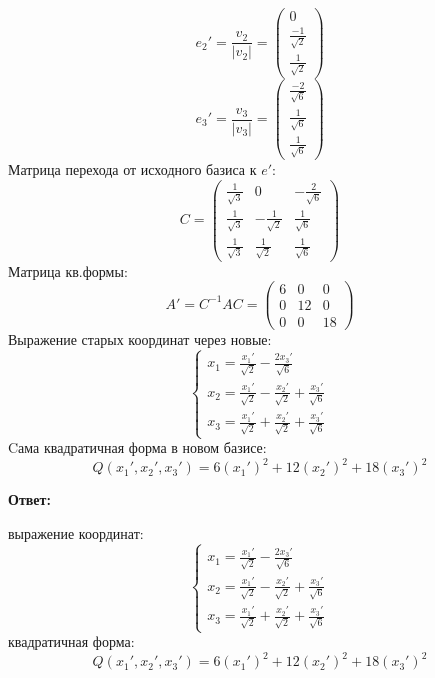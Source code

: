 \documentclass[a4paper,12pt]{article}
\begin{document}
\[
e_2' = \frac{v_2}{|v_2|} = \begin{pmatrix}
0 \\ \frac{-1}{\sqrt{2}} \\ \frac{1}{\sqrt{2}}
\end{pmatrix}
\]
\[
e_3' =  \frac{v_3}{|v_3|} = \begin{pmatrix}
\frac{-2}{\sqrt{6}} \\ \frac{1}{\sqrt{6}}  \\ \frac{1}{\sqrt{6}} 
\end{pmatrix}
\]
Матрица перехода от исходного базиса к $e'$:
\[
C = \begin{pmatrix}
\frac{1}{\sqrt{3}} & 0 & -\frac{2}{\sqrt{6}} \\
\frac{1}{\sqrt{3}}  & -\frac{1}{\sqrt{2}} & \frac{1}{\sqrt{6}}\\
\frac{1}{\sqrt{3}}  & \frac{1}{\sqrt{2}} & \frac{1}{\sqrt{6}}
\end{pmatrix}
\]
Матрица кв.формы:
\[
A' = C^{-1} A C = \begin{pmatrix}
6 & 0 & 0 \\
0 & 12 & 0 \\
0 & 0 & 18
\end{pmatrix}
\]
Выражение старых координат через новые:
\[
\begin{cases}
x_1 = \frac{x_1'}{\sqrt{2}}- \frac{2x_3'}{\sqrt{6}} \\
x_2 = \frac{x_1' }{\sqrt{2}}- \frac{x_2'}{\sqrt{2}}+\frac{ x_3'}{\sqrt{6}} \\
x_3 = \frac{x_1'}{\sqrt{2}} + \frac{x_2'}{\sqrt{2}}+ \frac{x_3'}{\sqrt{6}}
\end{cases}
\]
Cама квадратичная форма в новом базисе:
\[
Q(x_1', x_2', x_3') = 6(x_1')^2 + 12(x_2')^2 + 18(x_3')^2
\]

\begin{center}
\textbf{Ответ: } 

выражение координат:
\[
\begin{cases}
x_1 = \frac{x_1'}{\sqrt{2}}- \frac{2x_3'}{\sqrt{6}} \\
x_2 = \frac{x_1' }{\sqrt{2}}- \frac{x_2'}{\sqrt{2}}+\frac{ x_3'}{\sqrt{6}} \\
x_3 = \frac{x_1'}{\sqrt{2}} + \frac{x_2'}{\sqrt{2}}+ \frac{x_3'}{\sqrt{6}}
\end{cases}
\]
квадратичная форма:
\[
Q(x_1', x_2', x_3') = 6(x_1')^2 + 12(x_2')^2 + 18(x_3')^2
\]
\end{center}
\clearpage
\end{document}
